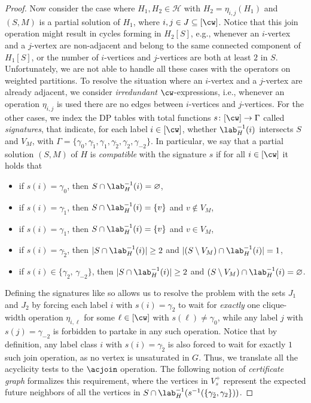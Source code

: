\begin{proof}
    Now consider the case where $H_1,H_2 \in \mathcal{H}$ with $H_2 = \eta_{i,j}(H_1)$ and $(S,M)$ is a partial solution of $H_1$,
    where $i,j \in J \subseteq [\cw]$.
    Notice that this join operation might result in cycles forming in $H_2[S]$, e.g.,
    whenever an $i$-vertex and a $j$-vertex are non-adjacent and belong to the same connected component of $H_1[S]$,
    or the number of $i$-vertices and $j$-vertices are both at least $2$ in $S$.
    Unfortunately, we are not able to handle all these cases with the operators on weighted partitions.
    To resolve the situation where an $i$-vertex and a $j$-vertex are already adjacent,
    we consider \emph{irredundant} $\cw$-expressions, i.e., whenever an operation $\eta_{i,j}$ is used there are no edges
    between $i$-vertices and $j$-vertices.
    For the other cases, we index the DP tables with total functions $s \colon [\cw] \to \Gamma$ called \emph{signatures}, that indicate, for each label $i \in [\cw]$, whether $\lab_H^{-1}(i)$ intersects $S$ and $V_M$,
    with $\Gamma = \{\gamma_0,\gamma_{\tilde{1}},\gamma_1,\gamma_{\tilde{2}},\gamma_2,\gamma_{-2}\}$.
    In particular, we say that a partial solution $(S,M)$ of $H$ is \emph{compatible} with the signature $s$ if for all $i \in [\cw]$
    it holds that
    \begin{itemize}
        \item if $s(i) = \gamma_0$, then $S \cap \lab^{-1}_H(i) = \varnothing$,

        \item if $s(i) = \gamma_{\tilde{1}}$, then $S \cap \lab^{-1}_H(i) = \{v\}$ and $v \notin V_M$,

        \item if $s(i) = \gamma_1$, then $S \cap \lab^{-1}_H(i) = \{v\}$ and $v \in V_M$,

        \item if $s(i) = \gamma_{\tilde{2}}$, then $|S \cap \lab^{-1}_H(i)| \ge 2$ and $|(S \setminus V_M) \cap \lab^{-1}_H(i)| = 1$,

        \item if $s(i) \in \{\gamma_2, \, \gamma_{-2}\}$, then $|S \cap \lab^{-1}_H(i)| \ge 2$ and $(S \setminus V_M) \cap \lab^{-1}_H(i) = \varnothing$.
    \end{itemize}
    Defining the signatures like so allows us to resolve the problem with the sets $J_1$ and $J_2$ by forcing each label
    $i$ with $s(i) = \gamma_2$ to wait for \emph{exactly} one clique-width operation $\eta_{i,\ell}$ for some $\ell \in [\cw]$ with $s(\ell) \neq \gamma_0$,
    while any label $j$ with $s(j) = \gamma_{-2}$ is forbidden to partake in any such operation.
    Notice that by definition, any label class $i$ with $s(i) = \gamma_{\tilde{2}}$ is also forced to wait for exactly $1$ such join operation,
    as no vertex is unsaturated in $G$.
    Thus, we translate all the acyclicity tests to the $\acjoin$ operation.
    The following notion of \emph{certificate graph} formalizes this requirement,
    where the vertices in $V^+_s$ represent the expected future neighbors of all the vertices in
    $S \cap \lab^{-1}_H(s^{-1}(\{\gamma_{\tilde{2}},\gamma_2\}))$.





\end{proof}

